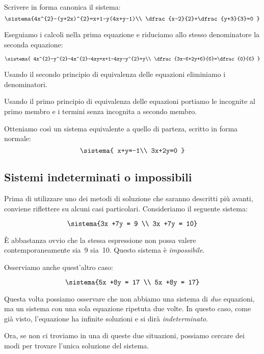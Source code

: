  \begin{esempio}{}{}
 Scrivere in forma canonica il sistema:
\[\sistema{4x^{2}-(y+2x)^{2}=x+1-y(4x+y-1)\\
\dfrac{x-2}{2}+\dfrac{y+3}{3}=0
}\]

Eseguiamo i calcoli nella prima equazione e riduciamo allo stesso
denominatore la seconda equazione:

\[\sistema{
 4x^{2}-y^{2}-4x^{2}-4xy=x+1-4xy-y^{2}+y\\
 \dfrac{3x-6+2y+6}{6}=\dfrac{0}{6}
 }\]

Usando il secondo principio di equivalenza delle equazioni eliminiamo i 
denominatori.

Usando il primo principio di equivalenza delle equazioni portiamo le
incognite al primo membro e i termini senza incognita a secondo membro.

Otteniamo così un sistema equivalente a quello di parteza, scritto in forma 
normale:
 \[\sistema{
   x+y=-1\\
   3x+2y=0
}\]
 \end{esempio}

\subsection{Sistemi indeterminati o impossibili}

Prima di utilizzare uno dei metodi di soluzione che saranno descritti più 
avanti, conviene riflettere su alcuni casi particolari. Consideriamo il 
seguente sistema:

\[\sistema{3x +7y = 9 \\ 3x +7y = 10}\]

È abbastanza ovvio che la stessa espressione non possa valere 
contemporaneamente sia~9 sia~10. Questo sistema è \emph{impossibile}.

Osserviamo anche quest'altro caso:

\[\sistema{5x +8y = 17 \\ 5x +8y = 17}\]

Questa volta possiamo osservare che non abbiamo una sistema di \emph{due} 
equazioni, ma un sistema con una sola equazione ripetuta due volte. 
In questo caso, come già visto, l'equazione ha infinite soluzioni e si 
dirà \emph{indeterminato}.

Ora, se non ci troviamo in una di queste due situazioni, possiamo cercare 
dei modi per trovare l'unica soluzione del sistema.

